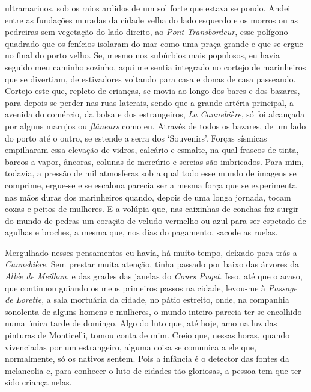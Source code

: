 ultramarinos, sob os raios ardidos de um sol forte que estava se pondo.
Andei entre as fundações muradas da cidade velha do lado esquerdo e os
morros ou as pedreiras sem vegetação do lado direito, ao \emph{Pont
Transbordeur}, esse polígono quadrado que os fenícios isolaram do mar
como uma praça grande e que se ergue no final do porto velho. Se, mesmo
nos subúrbios mais populosos, eu havia seguido meu caminho sozinho, aqui
me sentia integrado no cortejo de marinheiros que se divertiam, de
estivadores voltando para casa e donas de casa passeando. Cortejo este
que, repleto de crianças, se movia ao longo dos bares e dos bazares,
para depois se perder nas ruas laterais, sendo que a grande artéria
principal, a avenida do comércio, da bolsa e dos estrangeiros, \emph{La
Cannebière}, só foi alcançada por alguns marujos ou \emph{flâneurs} como
eu. Através de todos os bazares, de um lado do porto até o outro, se
estende a serra dos `Souvenirs'. Forças sísmicas empilharam essa
elevação de vidros, calcário e esmalte, na qual frascos de tinta, barcos
a vapor, âncoras, colunas de mercúrio e sereias são imbricados. Para
mim, todavia, a pressão de mil atmosferas sob a qual todo esse mundo de
imagens se comprime, ergue-se e se escalona parecia ser a mesma força
que se experimenta nas mãos duras dos marinheiros quando, depois de uma
longa jornada, tocam coxas e peitos de mulheres. E a volúpia que, nas
caixinhas de conchas faz surgir do mundo de pedras um coração de veludo
vermelho ou azul para ser espetado de agulhas e broches, a mesma que,
nos dias do pagamento, sacode as ruelas.

Mergulhado nesses pensamentos eu havia, há muito tempo, deixado para
trás a \emph{Cannebière}. Sem prestar muita atenção, tinha passado por
baixo das árvores da \emph{Allée de Meilhan}, e das grades das janelas
do \emph{Cours Puget}. Isso, até que o acaso, que continuou guiando os
meus primeiros passos na cidade, levou-me à \emph{Passage de Lorette}, a
sala mortuária da cidade, no pátio estreito, onde, na companhia
sonolenta de alguns homens e mulheres, o mundo inteiro parecia ter se
encolhido numa única tarde de domingo. Algo do luto que, até hoje, amo
na luz das pinturas de Monticelli, tomou conta de mim. Creio que, nessas
horas, quando vivenciadas por um estrangeiro, alguma coisa se comunica a
ele que, normalmente, só os nativos sentem. Pois a infância é o detector
das fontes da melancolia e, para conhecer o luto de cidades tão
gloriosas, a pessoa tem que ter sido criança nelas.

